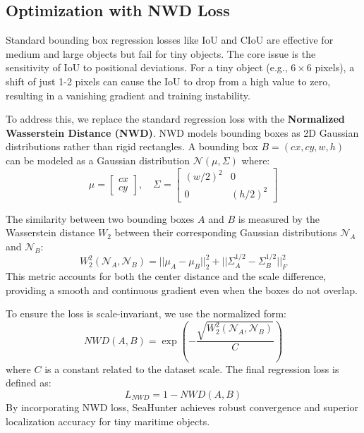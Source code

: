 \documentclass[lettersize,journal]{IEEEtran}
\begin{document}
\subsection{Optimization with NWD Loss}
Standard bounding box regression losses like IoU and CIoU are effective for medium and large objects but fail for tiny objects. The core issue is the sensitivity of IoU to positional deviations. For a tiny object (e.g., $6 \times 6$ pixels), a shift of just 1-2 pixels can cause the IoU to drop from a high value to zero, resulting in a vanishing gradient and training instability.

To address this, we replace the standard regression loss with the \textbf{Normalized Wasserstein Distance (NWD)}. NWD models bounding boxes as 2D Gaussian distributions rather than rigid rectangles. A bounding box $B = (cx, cy, w, h)$ can be modeled as a Gaussian distribution $\mathcal{N}(\mu, \Sigma)$ where:
\begin{equation}
\mu = \begin{bmatrix} cx \\ cy \end{bmatrix}, \quad \Sigma = \begin{bmatrix} (w/2)^2 & 0 \\ 0 & (h/2)^2 \end{bmatrix}
\end{equation}

The similarity between two bounding boxes $A$ and $B$ is measured by the Wasserstein distance $W_2$ between their corresponding Gaussian distributions $\mathcal{N}_A$ and $\mathcal{N}_B$:
\begin{equation}
W_2^2(\mathcal{N}_A, \mathcal{N}_B) = ||\mu_A - \mu_B||_2^2 + ||\Sigma_A^{1/2} - \Sigma_B^{1/2}||_F^2
\end{equation}
This metric accounts for both the center distance and the scale difference, providing a smooth and continuous gradient even when the boxes do not overlap.

To ensure the loss is scale-invariant, we use the normalized form:
\begin{equation}
    NWD(A, B) = \exp\left(-\frac{\sqrt{W_2^2(\mathcal{N}_A, \mathcal{N}_B)}}{C}\right)
\end{equation}
where $C$ is a constant related to the dataset scale. The final regression loss is defined as:
\begin{equation}
    L_{NWD} = 1 - NWD(A, B)
\end{equation}
By incorporating NWD loss, SeaHunter achieves robust convergence and superior localization accuracy for tiny maritime objects.
\end{document}
